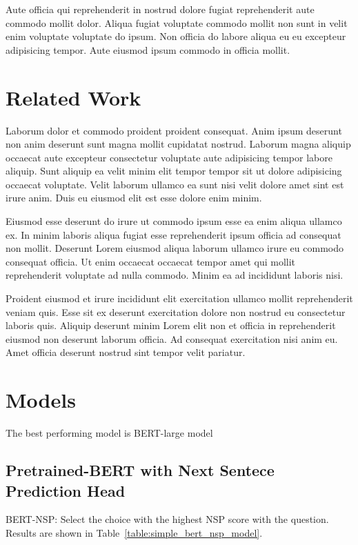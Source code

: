 \documentclass[letterpaper]{article} %
\begin{document}
Aute officia qui reprehenderit in nostrud dolore fugiat reprehenderit aute commodo mollit dolor. Aliqua fugiat voluptate commodo mollit non sunt in velit enim voluptate voluptate do ipsum. Non officia do labore aliqua eu eu excepteur adipisicing tempor. Aute eiusmod ipsum commodo in officia mollit.

\section{Related Work}

Laborum dolor et commodo proident proident consequat. Anim ipsum deserunt non anim deserunt sunt magna mollit cupidatat nostrud. Laborum magna aliquip occaecat aute excepteur consectetur voluptate aute adipisicing tempor labore aliquip. Sunt aliquip ea velit minim elit tempor tempor sit ut dolore adipisicing occaecat voluptate. Velit laborum ullamco ea sunt nisi velit dolore amet sint est irure anim. Duis eu eiusmod elit est esse dolore enim minim.

Eiusmod esse deserunt do irure ut commodo ipsum esse ea enim aliqua ullamco ex. In minim laboris aliqua fugiat esse reprehenderit ipsum officia ad consequat non mollit. Deserunt Lorem eiusmod aliqua laborum ullamco irure eu commodo consequat officia. Ut enim occaecat occaecat tempor amet qui mollit reprehenderit voluptate ad nulla commodo. Minim ea ad incididunt laboris nisi.

Proident eiusmod et irure incididunt elit exercitation ullamco mollit reprehenderit veniam quis. Esse sit ex deserunt exercitation dolore non nostrud eu consectetur laboris quis. Aliquip deserunt minim Lorem elit non et officia in reprehenderit eiusmod non deserunt laborum officia. Ad consequat exercitation nisi anim eu. Amet officia deserunt nostrud sint tempor velit pariatur.

\section{Models}

The best performing model is BERT-large model ~\cite{talmor2018commonsenseqa}

\subsection{Pretrained-BERT with Next Sentece Prediction Head}

BERT-NSP: Select the choice with the highest NSP score with the question. Results are shown in Table~\ref{table:simple_bert_nsp_model}.
\end{document}
